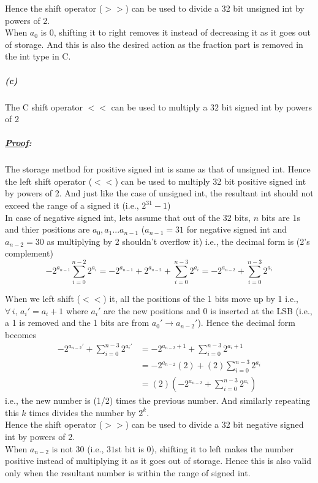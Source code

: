 \documentclass[12pt, letterpaper]{article}
\begin{document}
Hence the shift operator ($>>$) can be used to divide a 32 bit unsigned int by powers of 2.\\

When $a_{0}$ is $0$, shifting it to right removes it instead of decreasing it as it goes out of storage. And this is also the desired action as the fraction part is removed in the int type in C.

\subparagraph{(c)} The C shift operator $<<$ can be used to multiply a $32$ bit signed int by powers of 2
\subparagraph{\textit{\underline{Proof}:}}

The storage method for positive signed int is same as that of unsigned int. Hence the left shift operator ($<<$) can be used to multiply 32 bit positive signed int by powers of 2. And just like the case of unsigned int, the resultant int should not exceed the range of a signed it (i.e., $2^{31} - 1$)\\


In case of negative signed int, lets assume that out of the $32$ bits, $n$ bits are $1$s and thier positions are $a_0,a_1 ...a_{n-1}$ ($a_{n-1} = 31$ for negative signed int and $a_{n-2} = 30$ as multiplying by 2 shouldn't overflow it) i.e., the decimal form is (2's complement)
\[
-2^{a_{n-1}} \sum_{i=0}^{n-2}2^{a_i}
= -2^{a_{n-1}} + 2^{a_{n-2}} + \sum_{i=0}^{n-3}2^{a_i}
= \boxed{-2^{a_{n-2}} + \sum_{i=0}^{n-3}2^{a_i}}
\]

When we left shift ($<<$) it, all the positions of the 1 bits move up by 1 i.e., $\forall\, i,\,a_i' = a_i + 1$  where $a_i'$ are the new positions and $0$ is inserted at the LSB (i.e., a 1 is removed and the 1 bits are from $a_0' \to a_{n-2}'$).
Hence the decimal form becomes
\[\begin{split}
-2^{a_{n-2}'} + \sum_{i=0}^{n-3}2^{a_i'}
&=-2^{a_{n-2} + 1} + \sum_{i=0}^{n-3}2^{a_i + 1}\\
&= -2^{a_{n-2}}(2) + (2)\sum_{i=0}^{n-3}2^{a_i}\\
&= \boxed{(2)(-2^{a_{n-2}} + \sum_{i=0}^{n-3}2^{a_i})}
\end{split}\]
i.e., the new number is (1/2) times the previous number.
And similarly repeating this $k$ times divides the number by $2^k$.\\

Hence the shift operator ($>>$) can be used to divide a 32 bit negative signed int by powers of 2.\\

When $a_{n-2}$ is not $30$ (i.e., $31$st bit is $0$), shifting it to left makes the number positive instead of multiplying it as it goes out of storage. Hence this is also valid only when the resultant number is within the range of signed int.
\end{document}
